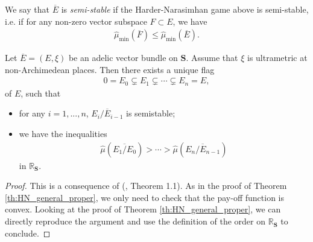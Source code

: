 \documentclass [11pt,reqno]{amsart}
\def\bR{{\mathbb{R}}}
\newcommand{\1}{\mathmybb{1}}
\begin{document}
\begin{definition}
\label{def:semi-stability_adelic_vector_bundle_Nevanlinna}
We say that $\overline{E}$ is \emph{semi-stable} if the Harder-Narasimhan game above is semi-stable, i.e. if for any non-zero vector subspace $F\subset E$, we have
\begin{align*}
\widehat{\mu}_{\min}(\overline{F}) \leq \widehat{\mu}_{\min}(\overline{E}).
\end{align*}
\end{definition}

\begin{theorem}
\label{th:HN_Nevanlinna}
Let $\overline{E}=(E,\xi)$ be an adelic vector bundle on $\mathbf{S}$. Assume that $\xi$ is ultrametric at non-Archimedean places. Then there exists a unique flag 
\begin{align*}
0=E_{0} \subsetneq E_{1} \subsetneq \cdots \subsetneq E_{n} = E,
\end{align*}
of $E$, such that
\begin{itemize}
	\item[(1)] for any $i=1,...,n$, $\overline{E_i/E_{i-1}}$ is semistable;
	\item[(2)] we have the inequalities 
	\begin{align*}
	\widehat{\mu}(\overline{E_1/E_0}) > \cdots > \widehat{\mu}(\overline{E_n/E_{n-1}})
	\end{align*}
	in $\bR_{\mathbf{S}}$.
\end{itemize}
\end{theorem}

\begin{proof}
This is a consequence of (\cite{ChenJeannin23}, Theorem 1.1). As in the proof of Theorem \ref{th:HN_general_proper}, we only need to check that the pay-off function is convex. Looking at the proof of Theorem \ref{th:HN_general_proper}, we can directly reproduce the argument and use the definition of the order on $\bR_{\mathbf{S}}$ to conclude. 
\end{proof}
\end{document}
